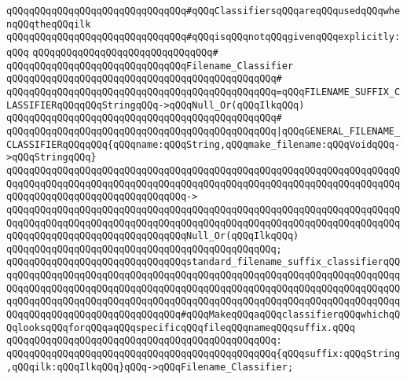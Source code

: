 \newline
\verb|qQQqqQQqqQQqqQQqqQQqqQQqqQQqqQQq#qQQqClassifiersqQQqareqQQqusedqQQqwhenqQQqtheqQQqilk|\newline
\verb|qQQqqQQqqQQqqQQqqQQqqQQqqQQqqQQq#qQQqisqQQqnotqQQqgivenqQQqexplicitly:qQQq|\newline
\verb|qQQqqQQqqQQqqQQqqQQqqQQqqQQqqQQq#|\newline
\verb|qQQqqQQqqQQqqQQqqQQqqQQqqQQqqQQqFilename_Classifier|\newline
\verb|qQQqqQQqqQQqqQQqqQQqqQQqqQQqqQQqqQQqqQQqqQQqqQQq#|\newline
\verb|qQQqqQQqqQQqqQQqqQQqqQQqqQQqqQQqqQQqqQQqqQQqqQQq=qQQqFILENAME_SUFFIX_CLASSIFIERqQQqqQQqStringqQQq->qQQqNull_Or(qQQqIlkqQQq)|\newline
\verb|qQQqqQQqqQQqqQQqqQQqqQQqqQQqqQQqqQQqqQQqqQQqqQQq#|\newline
\verb|qQQqqQQqqQQqqQQqqQQqqQQqqQQqqQQqqQQqqQQqqQQqqQQq|\verb#|qQQqGENERAL_FILENAME_CLASSIFIERqQQqqQQq{qQQqname:qQQqString,qQQqmake_filename:qQQqVoidqQQq->qQQqStringqQQq}#\newline
\verb|qQQqqQQqqQQqqQQqqQQqqQQqqQQqqQQqqQQqqQQqqQQqqQQqqQQqqQQqqQQqqQQqqQQqqQQqqQQqqQQqqQQqqQQqqQQqqQQqqQQqqQQqqQQqqQQqqQQqqQQqqQQqqQQqqQQqqQQqqQQqqQQqqQQqqQQqqQQqqQQqqQQqqQQqqQQq->|\newline
\verb|qQQqqQQqqQQqqQQqqQQqqQQqqQQqqQQqqQQqqQQqqQQqqQQqqQQqqQQqqQQqqQQqqQQqqQQqqQQqqQQqqQQqqQQqqQQqqQQqqQQqqQQqqQQqqQQqqQQqqQQqqQQqqQQqqQQqqQQqqQQqqQQqqQQqqQQqqQQqqQQqqQQqqQQqqQQqNull_Or(qQQqIlkqQQq)|\newline
\verb|qQQqqQQqqQQqqQQqqQQqqQQqqQQqqQQqqQQqqQQqqQQqqQQq;|\newline
\newline
\verb|qQQqqQQqqQQqqQQqqQQqqQQqqQQqqQQqstandard_filename_suffix_classifierqQQqqQQqqQQqqQQqqQQqqQQqqQQqqQQqqQQqqQQqqQQqqQQqqQQqqQQqqQQqqQQqqQQqqQQqqQQqqQQqqQQqqQQqqQQqqQQqqQQqqQQqqQQqqQQqqQQqqQQqqQQqqQQqqQQqqQQqqQQqqQQqqQQqqQQqqQQqqQQqqQQqqQQqqQQqqQQqqQQqqQQqqQQqqQQqqQQqqQQqqQQqqQQqqQQqqQQqqQQqqQQqqQQqqQQqqQQqqQQqqQQq#qQQqMakeqQQqaqQQqclassifierqQQqwhichqQQqlooksqQQqforqQQqaqQQqspecificqQQqfileqQQqnameqQQqsuffix.qQQq|\newline
\verb|qQQqqQQqqQQqqQQqqQQqqQQqqQQqqQQqqQQqqQQqqQQqqQQq:|\newline
\verb|qQQqqQQqqQQqqQQqqQQqqQQqqQQqqQQqqQQqqQQqqQQqqQQq{qQQqsuffix:qQQqString,qQQqilk:qQQqIlkqQQq}qQQq->qQQqFilename_Classifier;|\newline
\newline
\newline
